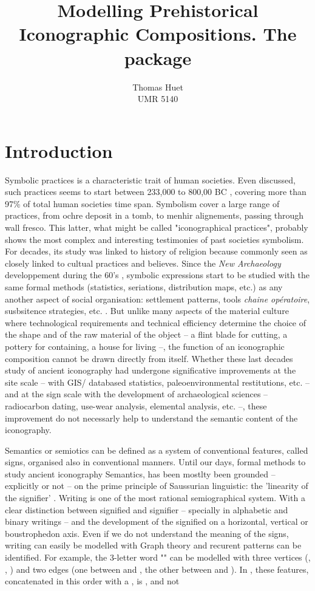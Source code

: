 \documentclass[article]{jss}\usepackage{knitr}
\author{Thomas Huet\\UMR 5140}
\title{Modelling Prehistorical Iconographic Compositions. The \proglang{R} package \pkg{decorr}}
\begin{document}

\section[Introduction]{Introduction} \label{sec:intro}

Symbolic practices is a characteristic trait of human societies. Even discussed, such practices seems to start between 233,000 to 800,00 BC \citep{dErrico00}, covering more than 97\% of total human societies time span. Symbolism cover a large range of practices, from ochre deposit in a tomb, to menhir alignements, passing through wall fresco. This latter, what might be called "iconographical practices", probably shows the most complex and interesting testimonies of past societies symbolism. For decades, its study was linked to history of religion because commonly seen as closely linked to cultual practices and believes. Since the \textit{New Archaeology} developpement during the 60's \citep{Clarke14}, symbolic expressions start to be studied with the same formal methods (statistics, seriations, distribution maps, etc.) as any another aspect of social organisation: settlement patterns, tools \emph{chaine op\'eratoire}, susbsitence strategies, etc. \citep{Renfrew91}. But unlike many aspects of the material culture where technological requirements and technical efficiency determine the choice of the shape and of the raw material of the object -- a flint blade for cutting, a pottery for containing, a house for living --, the function of an iconographic composition cannot be drawn directly from itself. Whether these last decades study of ancient iconography had  undergone significative improvements at the site scale -- with GIS/ databased statistics, paleoenvironmental restitutions, etc. -- and at the sign scale with the development of archaeological sciences -- radiocarbon dating, use-wear analysis, elemental analysis, etc. --, these improvement do not necessarly help to understand the semantic content of the iconography.

Semantics or semiotics can be defined as a system of conventional features, called signs, organised also in conventional manners. Until our days, formal methods to study ancient iconography Semantics, has been mostlty been grounded  -- explicitly or not -- on the prime principle of Saussurian linguistic: the 'linearity of the signifier' \citep{Saussure89}.  
Writing is one of the most rational semiographical system. With a clear distinction between signified and signifier -- specially in alphabetic and binary writings -- and the development of the signified on a horizontal, vertical or boustrophedon axis. Even if we do not understand the meaning of the signs, writing can easily be modelled with Graph theory and recurent patterns can be identified. For example, the 3-letter word "" can be modelled with three vertices (, , ) and two edges (one between  and , the other between  and ). In , these features, concatenated in this order with a , is , and not 
\end{document}
